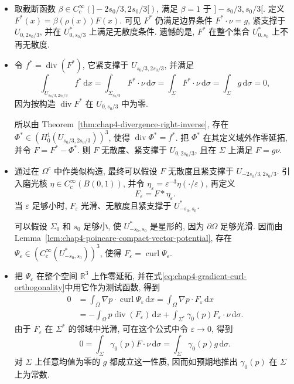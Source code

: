 \begin{Proof}
\begin{itemize}
 按构造, $F$ 在 $\Omega$ 中光滑、无散度, 并在边界 $\partial\Omega$ 上满足 $F\cdot\nu=g$. 此外, 由于 $g$ 支撑于 $\Sigma_0$, 可见 $F$ 支撑于 $U_{0,s_0}$.

 \item 取截断函数 $\beta\in C_c^\infty(]-2s_0/3,2s_0/3[)$, 满足 $\beta=1$ 于 $]-s_0/3,s_0/3[$. 定义 $F^*(x)=\beta(\rho(x))F(x)$. 可见 $F^*$ 仍满足边界条件 $F^*\cdot\nu=g$, 紧支撑于 $U_{0,2s_0/3}$, 并在 $U_{0,s_0/3}^*$ 上满足无散度条件. 遗憾的是, $F^*$ 在整个集合 $U_{0,s_0}^*$ 上不再无散度.

 \item 令 $f^*=\operatorname{div}(F^*)$, 它紧支撑于 $U_{s_0/3,2s_0/3}$, 并满足
 \[
  \int_{U_{s_0/3,2s_0/3}}f^*\,\mathrm dx
  =\int_{\Sigma_{s_0/3}}F^*\cdot\nu\,\mathrm d\sigma
  =\int_\Sigma F^*\cdot\nu\,\mathrm d\sigma
  =\int_\Sigma g\,\mathrm d\sigma=0,
 \]
 因为按构造 $\operatorname{div}F^*$ 在 $U_{0,s_0/3}$ 中为零.

 所以由 Theorem~\ref{thm:chap4-divergence-right-inverse}, 存在 $\Phi^*\in(H_0^1(U_{s_0/3,2s_0/3}))^3$, 使得 $\operatorname{div}\Phi^*=f^*$. 把 $\Phi^*$ 在其定义域外作零延拓, 并令 $F=F^*-\Phi^*$. 则 $F$ 无散度、紧支撑于 $U_{0,2s_0/3}$, 且在 $\Sigma$ 上满足 $F=g\nu$.

 \item 通过在 $\Omega^c$ 中作类似构造, 最终可以假设 $F$ 无散度且紧支撑于 $U_{-2s_0/3,2s_0/3}$. 引入磨光核 $\eta\in C_c^\infty(B(0,1))$, 并令 $\eta_\varepsilon=\varepsilon^{-3}\eta(\cdot/\varepsilon)$, 再定义
 \[
  F_\varepsilon=F*\eta_\varepsilon.
 \]
 当 $\varepsilon$ 足够小时, $F_\varepsilon$ 光滑、无散度且紧支撑于 $U_{-s_0,s_0}^*$.

 可以假设 $\Sigma_0$ 和 $s_0$ 足够小, 使 $U_{-s_0,s_0}^*$ 是星形的, 因为 $\partial\Omega$ 足够光滑. 因而由 Lemma~\ref{lem:chap4-poincare-compact-vector-potential}, 存在 $\Psi_\varepsilon\in(C_c^\infty(U_{-s_0,s_0}^*))^3$, 使得 $F_\varepsilon=\operatorname{curl}\Psi_\varepsilon$.

 \item 把 $\Psi_\varepsilon$ 在整个空间 $\mathbb R^3$ 上作零延拓, 并在式\eqref{eq:chap4-gradient-curl-orthogonality}中用它作为测试函数, 得到
 \[
  \begin{aligned}
  0
  &=\int_\Omega\nabla p\cdot\operatorname{curl}\Psi_\varepsilon\,\mathrm dx
   =\int_\Omega\nabla p\cdot F_\varepsilon\,\mathrm dx\\
  &=-\int_\Omega p\operatorname{div}(F_\varepsilon)\,\mathrm dx
   +\int_{\Sigma^*}\gamma_0(p)F_\varepsilon\cdot\nu\,\mathrm d\sigma.
  \end{aligned}
 \]
 由于 $F_\varepsilon$ 在 $\Sigma^*$ 的邻域中光滑, 可在这个公式中令 $\varepsilon\to0$, 得到
 \[
  0=\int_\Sigma\gamma_0(p)F\cdot\nu\,\mathrm d\sigma
  =\int_\Sigma\gamma_0(p)g\,\mathrm d\sigma.
 \]
 对 $\Sigma$ 上任意均值为零的 $g$ 都成立这一性质, 因而如预期地推出 $\gamma_0(p)$ 在 $\Sigma$ 上为常数.
\end{itemize}
\end{Proof}

